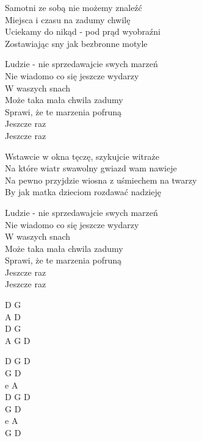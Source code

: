 \begin{text}
Samotni ze sobą nie możemy znaleźć\\
Miejsca i czasu na zadumy chwilę\\
Uciekamy do nikąd - pod prąd wyobraźni\\
Zostawiając sny jak bezbronne motyle

Ludzie - nie sprzedawajcie swych marzeń \\
Nie wiadomo co się jeszcze wydarzy\\
W waszych snach\\
Może taka mała chwila zadumy\\
Sprawi, że te marzenia pofruną\\
Jeszcze raz\\
Jeszcze raz

Wstawcie w okna tęczę, szykujcie witraże\\
Na które wiatr swawolny gwiazd wam nawieje\\
Na pewno przyjdzie wiosna z uśmiechem na twarzy\\
By jak matka dzieciom rozdawać nadzieję

Ludzie - nie sprzedawajcie swych marzeń \\
Nie wiadomo co się jeszcze wydarzy\\
W waszych snach\\
Może taka mała chwila zadumy\\
Sprawi, że te marzenia pofruną\\
Jeszcze raz\\
Jeszcze raz

\end{text}
\begin{chord}
D G\\
A D\\
D G\\
A G D

D G D\\
G D\\
e A\\
D G D\\
G D\\
e A\\
G D
\end{chord}